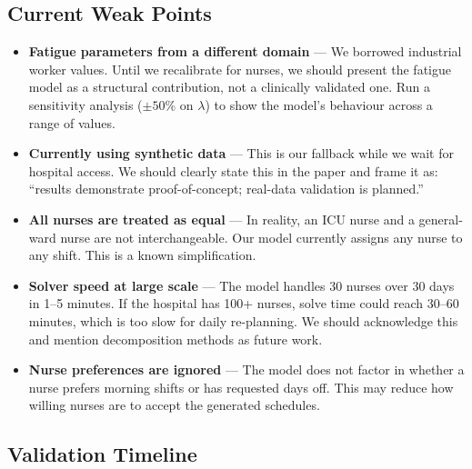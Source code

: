 \documentclass[12pt,a4paper]{article}
\begin{document}
\subsection{Current Weak Points}

\begin{warnbox}
\begin{itemize}[itemsep=6pt]
  \item \textbf{Fatigue parameters from a different domain} — We borrowed industrial worker values. Until we recalibrate for nurses, we should present the fatigue model as a structural contribution, not a clinically validated one. Run a sensitivity analysis ($\pm50\%$ on $\lambda$) to show the model's behaviour across a range of values.

  \item \textbf{Currently using synthetic data} — This is our fallback while we wait for hospital access. We should clearly state this in the paper and frame it as: ``results demonstrate proof-of-concept; real-data validation is planned.''

  \item \textbf{All nurses are treated as equal} — In reality, an ICU nurse and a general-ward nurse are not interchangeable. Our model currently assigns any nurse to any shift. This is a known simplification.

  \item \textbf{Solver speed at large scale} — The model handles 30 nurses over 30 days in 1–5 minutes. If the hospital has 100+ nurses, solve time could reach 30–60 minutes, which is too slow for daily re-planning. We should acknowledge this and mention decomposition methods as future work.

  \item \textbf{Nurse preferences are ignored} — The model does not factor in whether a nurse prefers morning shifts or has requested days off. This may reduce how willing nurses are to accept the generated schedules.
\end{itemize}
\end{warnbox}

\newpage
\subsection{Validation Timeline}
\end{document}
